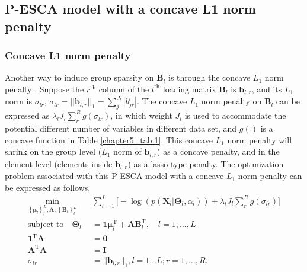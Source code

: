 \subsection{P-ESCA model with a concave L1 norm penalty}
\subsubsection{Concave L1 norm penalty}
Another way to induce group sparsity on $\mathbf{B}_l$ is through the concave $L_1$ norm penalty \cite{huang2012selective}. Suppose the $r^{\text{th}}$ column of the $l^{\text{th}}$ loading matrix $\mathbf{B}_l$ is $\mathbf{b}_{l,r}$, and its $L_1$ norm is $\sigma_{lr}$, $\sigma_{lr} = ||\mathbf{b}_{l,r}||_1 = \sum_{j}^{J_l} |b_{jr}^l|$. The concave $L_1$ norm penalty on $\mathbf{B}_l$ can be expressed as $\lambda_l J_l \sum_{r}^{R} g(\sigma_{lr})$, in which weight $J_l$ is used to accommodate the potential different number of variables in different data set, and $g()$ is a concave function in Table \ref{chapter5_tab:1}. This concave $L_1$ norm penalty will shrink on the group level ($L_1$ norm of $\mathbf{b}_{l,r}$) as a concave penalty, and in the element level (elements inside $\mathbf{b}_{l,r}$) as a lasso type penalty. The optimization problem associated with this P-ESCA model with a concave $L_1$ norm penalty can be expressed as follows,
\begin{equation}\label{chapter6_eq:2}
\begin{aligned}
    \min_{ \left\{\bm{\mu}_l\right\}_{l}^{L}, \mathbf{A}, \left\{\mathbf{B}_l\right\}_{l}^{L}} \quad & \sum_{l=1}^{L} \Big[ -\log(p(\mathbf{X}_l|\mathbf{\Theta}_l, \alpha_l)) + \lambda_l J_l \sum_{r}^{R} g(\sigma_{lr}) \Big] \\
    \text{subject to} \quad \mathbf{\Theta}_l &= \mathbf{1}\bm{\mu}_l^{\text{T}} + \mathbf{AB}_l^{\text{T}}, \quad l = 1,\ldots,L \\
     \mathbf{1}^{\text{T}}\mathbf{A} &= \mathbf{0}\\
	 \mathbf{A}^{\text{T}}\mathbf{A} &= \mathbf{I} \\
	 \sigma_{lr} &= ||\mathbf{b}_{l,r}||_1, l = 1...L; r = 1,\ldots, R.
\end{aligned}
\end{equation}

